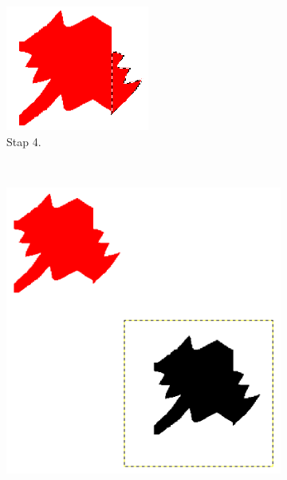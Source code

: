 \documentclass{article}
\begin{document}
\begin{figure}[Hh]
    \begin{subfigure}[b]{0.3\textwidth}    
        \includegraphics[width=\textwidth]{piece4.png}
        \caption{Stap 4.}
        \label{fig:stap4}
    \end{subfigure}%
     ~
    \begin{subfigure}[b]{0.3\textwidth}    
        \includegraphics[width=\textwidth]{piece5.png}

\end{subfigure}
\end{figure}
\end{document}
